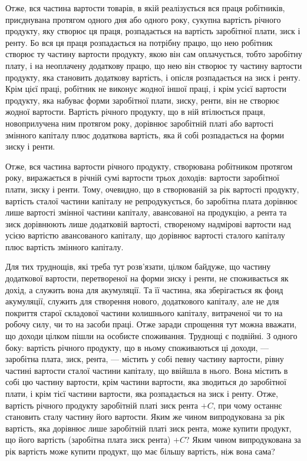 
Отже, вся частина вартости товарів, в якій реалізується вся праця робітників,
приєднувана протягом одного дня або одного року, сукупна вартість річного
продукту, яку створює ця праця, розпадається на вартість заробітної плати,
зиск і ренту. Бо вся ця праця розпадається на потрібну працю, що нею робітник
створює ту частину вартости продукту, якою він сам оплачується, тобто заробітну
плату, і на неоплачену додаткову працю, що нею він створює ту частину
вартости продукту, яка становить додаткову вартість, і опісля розпадається на
зиск і ренту. Крім цієї праці, робітник не виконує жодної іншої праці, і крім
усієї вартости продукту, яка набуває форми заробітної плати, зиску, ренти, він
не створює жодної вартости. Вартість річного продукту, що в ній втілюється праця,
новоприлучена ним протягом року, дорівнює заробітній платі або вартості змінного
капіталу плюс додаткова вартість, яка й собі розпадається на форми зиску
і ренти.

Отже, вся частина вартости річного продукту, створювана робітником протягом
року, виражається в річній сумі вартости трьох доходів: вартости заробітної
плати, зиску і ренти. Тому, очевидно, що в створюваній за рік вартості
продукту, вартість сталої частини капіталу не репродукується, бо заробітна
плата дорівнює лише вартості змінної частини капіталу, авансованої на продукцію,
а рента та зиск дорівнюють лише додатковій вартості, створеному надмірові
вартости над усією вартістю авансованого капіталу, що дорівнює вартості
сталого капіталу плюс вартість змінного капіталу.

Для тих труднощів, які треба тут розв’язати, цілком байдуже, що частину
додаткової вартости, перетвореної на форми зиску і ренти, не споживається як
дохід, а служить вона для акумуляції. Та її частина, яка зберігається як фонд акумуляції, служить
для створення нового, додаткового капіталу, але не для покриття
старої складової частини колишнього капіталу, витраченої чи то на
робочу силу, чи то на засоби праці. Отже заради спрощення тут можна вважати,
що доходи цілком пішли на особисте споживання. Труднощі є подвійні.
З одного боку: вартість річного продукту, що в ньому споживаються ці
доходи, — заробітна плата, зиск, рента, — містить у собі певну частину вартости,
рівну частині вартости сталої частини капіталу, що ввійшла в нього. Вона містить
в собі цю частину вартости, крім частини вартости, яка зводиться до заробітної
плати, і крім тієї частини вартости, яка розпадається на зиск і ренту. Отже,
вартість річного продукту \deq{} заробітній платі \dplus{} зиск \dplus{} рента $+ C$, при чому
останнє становить сталу частину його вартости. Яким же чином випродукована
за рік вартість, яка дорівнює лише заробітній платі \dplus{} зиск \dplus{} рента, може
купити продукт, що його вартість \deq{} (заробітна плата \dplus{} зиск \dplus{} рента) $+ C$?
Яким чином випродукована за рік вартість може купити продукт, що має
більшу вартість, ніж вона сама?

